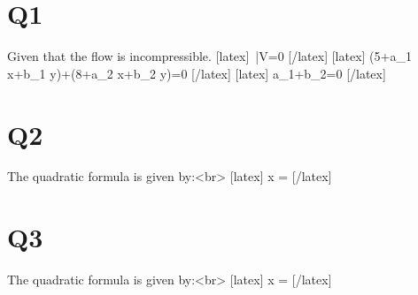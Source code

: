 \section*{Q1}
Given that the flow is incompressible.
[latex] \therefore \quad {}\,\bar{V}=0 [/latex]
[latex] \left(5+a_{1} x+b_{1} y\right)+\left(8+a_{2} x+b_{2} y\right)=0 [/latex]
[latex] a_{1}+b_{2}=0 [/latex]

\section*{Q2}
The quadratic formula is given by:<br>
[latex] x =  [/latex]

\section*{Q3}
The quadratic formula is given by:<br>
[latex] x =  [/latex]

